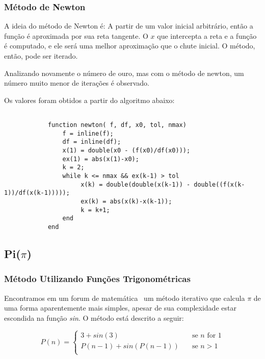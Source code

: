 		\subsubsection{Método de Newton}

			A ideia do método de Newton é: A partir de um valor inicial
			arbitrário, então a função é aproximada por sua reta tangente. O $x$
			que intercepta a reta e a função é computado, e ele será uma melhor
			aproximação que o chute inicial. O método, então, pode ser iterado.

			Analizando novamente o número de ouro, mas com o método de newton,
			um número muito menor de iterações é observado.

			

			Os valores foram obtidos a partir do algoritmo abaixo:

			\begin{lstlisting}

			function newton( f, df, x0, tol, nmax)
				f = inline(f);
				df = inline(df);
				x(1) = double(x0 - (f(x0)/df(x0)));
				ex(1) = abs(x(1)-x0);
				k = 2;
				while k <= nmax && ex(k-1) > tol
					 x(k) = double(double(x(k-1)) - double((f(x(k-1))/df(x(k-1)))));
					 ex(k) = abs(x(k)-x(k-1));
					 k = k+1;
				end
			end

			\end{lstlisting}

	\subsection{Pi($\pi$)}

		\subsubsection{Método Utilizando Funções Trigonométricas}

			Encontramos em um forum de matemática~\cite{mathForum} um método
			iterativo que calcula $\pi$ de uma forma aparentemente mais simples,
			apesar de sua complexidade estar escondida na função \emph{sin}. O
			método está descrito a seguir:

			\begin{equation}
			\label{magic_equation}
				P(n) =
				\begin{cases}
					3 + sin (3) & \quad \text{se } n \text{\ for } 1\\
					P(n-1) + sin(P(n-1)) & \quad \text{se } n > 1\\
				\end{cases}
			\end{equation}

